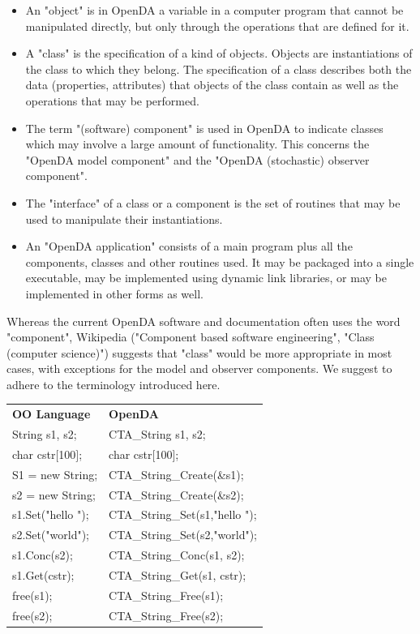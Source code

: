 \begin{itemize}
	\item An "object" is in OpenDA a variable in a computer program that cannot be manipulated directly, but only through the operations that are defined for it. 
	\item A "class" is the specification of a kind of objects. Objects are instantiations of the class to which they belong. The specification of a class describes both the data (properties, attributes) that objects of the class contain as well as the operations that may be performed. 
	\item The term "(software) component" is used in OpenDA to indicate classes which may involve a large amount of functionality. This concerns the "OpenDA model component" and the "OpenDA (stochastic) observer component". 
	\item The "interface" of a class or a component is the set of routines that may be used to manipulate their instantiations. 
	\item An "OpenDA application" consists of a main program plus all the components, classes and other routines used. It may be packaged into a single executable, may be implemented using dynamic link libraries, or may be implemented in other forms as well. 
\end{itemize}

Whereas the current OpenDA software and documentation often uses the word "component", Wikipedia ("Component based software engineering", "Class (computer science)") suggests that "class" would be more appropriate in most cases, with exceptions for the model and observer components. We suggest to adhere to the terminology introduced here.

\begin{tabular}{l l}
\textbf{OO Language} &	\textbf{OpenDA}\\
String s1, s2; &	CTA\_String s1, s2;\\
char cstr$[$100$]$; &	char cstr[100];\\
S1 = new String; &	CTA\_String\_Create(\&s1);\\
s2 = new String; &	CTA\_String\_Create(\&s2);\\
s1.Set("hello "); &	CTA\_String\_Set(s1,"hello ");\\
s2.Set("world"); &	CTA\_String\_Set(s2,"world");\\
s1.Conc(s2); &	CTA\_String\_Conc(s1, s2);\\
s1.Get(cstr); &	CTA\_String\_Get(s1, cstr);\\
free(s1); &	CTA\_String\_Free(s1);\\
free(s2); &	CTA\_String\_Free(s2);\\
\end{tabular}

